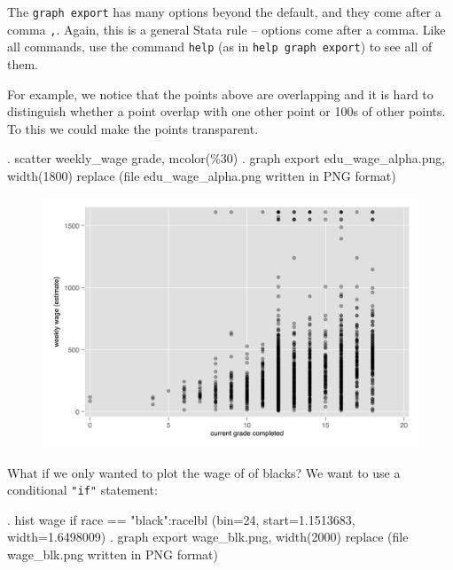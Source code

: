 \documentclass[]{article}
\begin{document}
The \texttt{graph\ export} has many options beyond the default, and they
come after a comma \texttt{,}. Again, this is a general Stata rule --
options come after a comma. Like all commands, use the command
\texttt{help} (as in \texttt{help\ graph\ export}) to see all of them.

For example, we notice that the points above are overlapping and it is
hard to distinguish whether a point overlap with one other point or 100s
of other points. To this we could make the points transparent.

\begin{stlog}
. scatter weekly_wage grade, mcolor(\%30)
{\smallskip}
. graph export edu_wage_alpha.png, width(1800) replace
(file edu_wage_alpha.png written in PNG format)
{\smallskip}
\end{stlog}

\begin{figure}
\centering
\includegraphics[width=1.00000\textwidth]{edu_wage_alpha.png}
\caption{}
\end{figure}

What if we only wanted to plot the wage of of blacks? We want to use a
conditional \texttt{"if"} statement:

\begin{stlog}
. hist wage if race == "black":racelbl
(bin=24, start=1.1513683, width=1.6498009)
{\smallskip}
. graph export wage_blk.png, width(2000) replace
(file wage_blk.png written in PNG format)
{\smallskip}
\end{stlog}
\end{document}
